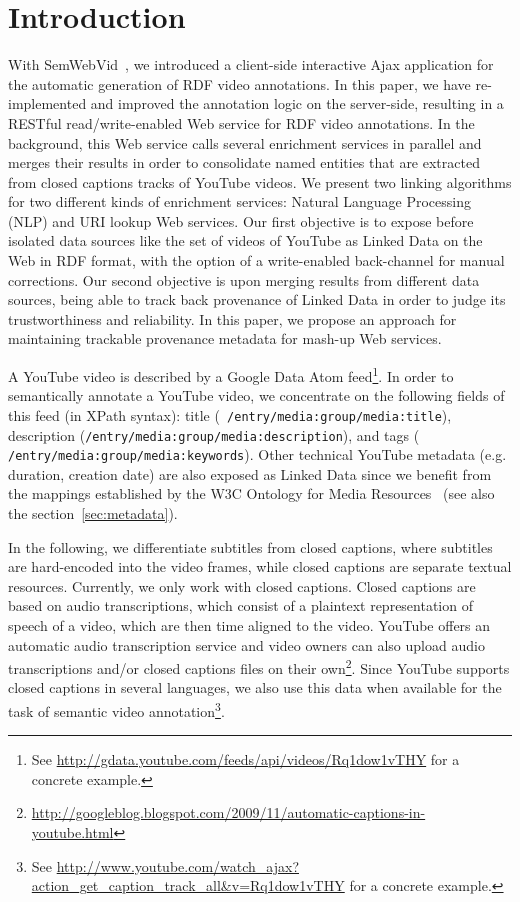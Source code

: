 \documentclass[conference]{IEEEtran}
\begin{document}
\section{Introduction}                                                      \label{sec:introduction}
With SemWebVid~\cite{Steiner:SemWebVid}, we introduced a client-side interactive Ajax application for the automatic
generation of RDF video annotations. In this paper, we have re-implemented and improved the annotation logic on the
server-side, resulting in a RESTful read/write-enabled Web service for RDF video annotations. In the background, this
Web service calls several enrichment services in parallel and merges their results in order to consolidate named entities that are extracted from closed captions tracks of YouTube videos. We present two linking algorithms for two different kinds of enrichment services: Natural Language Processing (NLP) and URI lookup Web services. Our first objective is to expose before isolated data sources like the set of videos of YouTube as Linked Data on the Web in RDF format, with the option of a write-enabled back-channel for manual corrections. Our second objective is upon merging results from different data sources, being able to track back provenance of Linked Data in order to judge its trustworthiness and reliability. In this paper, we propose an approach for maintaining trackable provenance metadata for mash-up Web services.

A YouTube video is described by a Google Data Atom feed\footnote{See
\url{http://gdata.youtube.com/feeds/api/videos/Rq1dow1vTHY} for a concrete example.}. In order to semantically annotate
a YouTube video, we concentrate on the following fields of this feed (in XPath syntax): title ({\tt
/entry/media:group/media:title}), description ({\tt /entry/media:group/media:description}), and tags ({\tt
/entry/media:group/media:keywords}). Other technical YouTube metadata (e.g. duration, creation date) are also exposed
as Linked Data since we benefit from the mappings established by the W3C Ontology for Media Resources~\cite{W3C:MediaOntology} (see also the
section~\ref{sec:metadata}).

In the following, we differentiate subtitles from closed captions, where subtitles are hard-encoded into the video
frames, while closed captions are separate textual resources. Currently, we only work with closed captions. Closed
captions are based on audio transcriptions, which consist of a plaintext representation of speech of a video, which are
then time aligned to the video. YouTube offers an automatic audio transcription service and video owners can also
upload audio transcriptions and/or closed captions files on their
own\footnote{\url{http://googleblog.blogspot.com/2009/11/automatic-captions-in-youtube.html}}. Since YouTube supports
closed captions in several languages, we also use this data when available for the task of semantic video
annotation\footnote{See \url{http://www.youtube.com/watch_ajax?action_get_caption_track_all&v=Rq1dow1vTHY} for a
concrete example.}.
\end{document}
